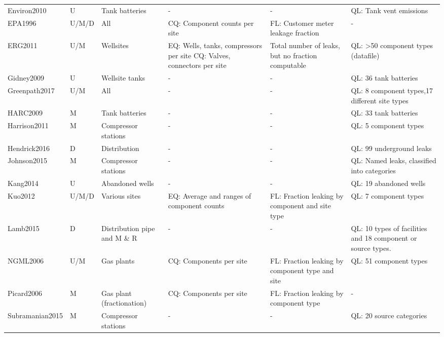 \documentclass[11pt]{report}
\begin{document}
\begin{landscape}
\begin{table}[]
\begin{scriptsize}
\begin{tabular*}{1\columnwidth}{p{}p{}p{}p{}p{}p{}}
Environ2010        	& U         			& Tank batteries        	& -      							& - 												& QL: Tank vent emissions      \\
EPA1996 			& U/M/D     		& All					& CQ: Component counts per site        	& FL: Customer meter leakage fraction       				& -       \\
ERG2011     		& U/M       		& Wellsites    			& EQ: Wells, tanks, compressors per site  CQ: Valves, connectors per site & Total number of leaks, but no fraction computable  & QL: >50 component types (datafile)          \\
Gidney2009  		& U         			& Wellsite tanks        		& -     							 & - 												& QL: 36 tank batteries       \\
Greenpath2017         & U/M       		& All					& -      							& - 												& QL: 8 component types,17 different site types  \\
HARC2009    		& M         			& Tank batteries        	& -      							& - 												& QL: 33 tank batteries       \\
Harrison2011		& M         			& Compressor stations    	& -      							& - 												& QL: 5 component types   \\
Hendrick2016		& D         			& Distribution      		& -      						& - 												& QL: 99 underground leaks    \\
Johnson2015 		& M         			& Compressor stations    	& -      							& - 												& QL: Named leaks, classified into categories     \\
Kang2014    		& U         			& Abandoned wells        	& -      							& - 												& QL: 19 abandoned wells      \\
Kuo2012     		& U/M/D     		& Various sites			& EQ: Average and ranges of component counts & FL: Fraction leaking by component and site type     	& QL: 7 component types       \\
Lamb2015    		& D         			& Distribution pipe and M \& R & -      						& - 												& QL: 10 types of facilities and 18 component or source types.        \\
NGML2006    		& U/M       		& Gas plants   			& CQ: Components per site    			& FL: Fraction leaking by component type and site     		& QL: 51 component types      \\
Picard2006  		& M         			& Gas plant (fractionation) & CQ: Components per site     			& FL: Fraction leaking by component type  				& -       \\
Subramanian2015   	& M         			& Compressor stations    	& -      							& - 												& QL: 20 source categories    \\

\end{tabular*}
\end{scriptsize}
\end{table}
\end{landscape}
\end{document}
